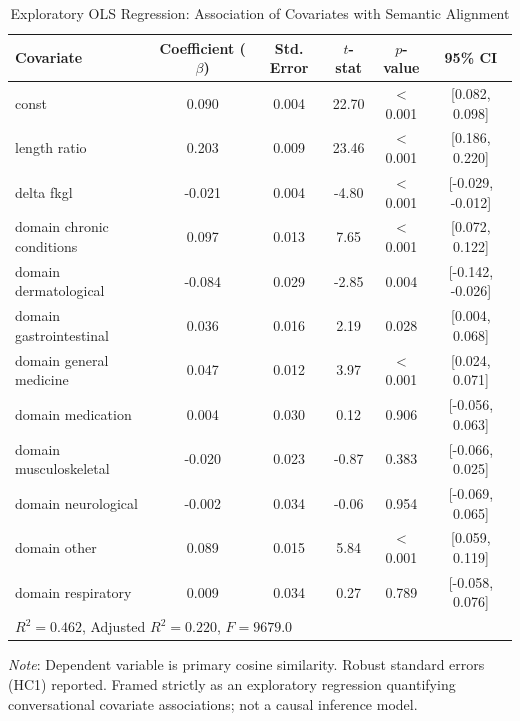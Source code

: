 \begin{table}[htbp]
\centering
\small
\caption{Exploratory OLS Regression: Association of Covariates with Semantic Alignment}
\label{tab:regression}
\begin{tabular}{lccccc}
\toprule
\textbf{Covariate} & \textbf{Coefficient ($\beta$)} & \textbf{Std. Error} & \textbf{$t$-stat} & \textbf{$p$-value} & \textbf{95\% CI} \\
\midrule
const & 0.090 & 0.004 & 22.70 & < 0.001 & [0.082, 0.098] \\
length ratio & 0.203 & 0.009 & 23.46 & < 0.001 & [0.186, 0.220] \\
delta fkgl & -0.021 & 0.004 & -4.80 & < 0.001 & [-0.029, -0.012] \\
domain chronic conditions & 0.097 & 0.013 & 7.65 & < 0.001 & [0.072, 0.122] \\
domain dermatological & -0.084 & 0.029 & -2.85 & 0.004 & [-0.142, -0.026] \\
domain gastrointestinal & 0.036 & 0.016 & 2.19 & 0.028 & [0.004, 0.068] \\
domain general medicine & 0.047 & 0.012 & 3.97 & < 0.001 & [0.024, 0.071] \\
domain medication & 0.004 & 0.030 & 0.12 & 0.906 & [-0.056, 0.063] \\
domain musculoskeletal & -0.020 & 0.023 & -0.87 & 0.383 & [-0.066, 0.025] \\
domain neurological & -0.002 & 0.034 & -0.06 & 0.954 & [-0.069, 0.065] \\
domain other & 0.089 & 0.015 & 5.84 & < 0.001 & [0.059, 0.119] \\
domain respiratory & 0.009 & 0.034 & 0.27 & 0.789 & [-0.058, 0.076] \\
\midrule
\multicolumn{6}{l}{$R^2 = 0.462$, Adjusted $R^2 = 0.220$, $F = 9679.0$} \\
\bottomrule
\end{tabular}
\begin{tablenotes}
\footnotesize
\item \textit{Note}: Dependent variable is primary cosine similarity. Robust standard errors (HC1) reported. Framed strictly as an exploratory regression quantifying conversational covariate associations; not a causal inference model.
\end{tablenotes}
\end{table}
